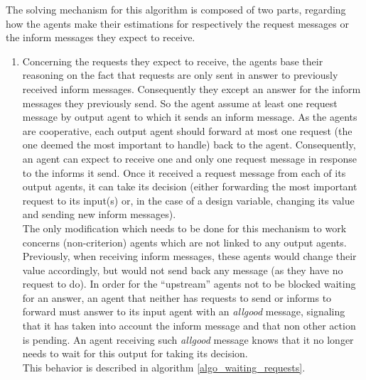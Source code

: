 The solving mechanism for this algorithm is composed of two parts, regarding how the agents make their estimations for respectively the request messages or the inform messages they expect to receive.
\begin{enumerate}
\item Concerning the requests they expect to receive, the agents base their reasoning on the fact that requests are only sent in answer to previously received inform messages. Consequently they except an answer for the inform messages they previously send. So the agent assume at least one request message by output agent to which it sends an inform message. As the agents are cooperative, each output agent should forward at most one request (the one deemed the most important to handle) back to the agent. Consequently, an agent can expect to receive one and only one request message in response to the informs it send. Once it received a request message from each of its output agents, it can take its decision (either forwarding the most important request to its input(s) or, in the case of a design variable, changing its value and sending new inform messages).\\
The only modification which needs to be done for this mechanism to work concerns (non-criterion) agents which are not linked to any output agents. Previously, when receiving inform messages, these agents would change their value accordingly, but would not send back any message (as they have no request to do). In order for the \enquote{upstream} agents not to be blocked waiting for an answer, an agent that neither has requests to send or informs to forward must answer to its input agent with an \emph{allgood} message, signaling that it has taken into account the inform message and that non other action is pending. An agent receiving such \emph{allgood} message knows that it no longer needs to wait for this output for taking its decision.\\
This behavior is described in algorithm \ref{algo_waiting_requests}.


\end{enumerate}
